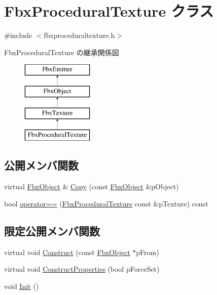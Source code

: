\hypertarget{class_fbx_procedural_texture}{}\section{Fbx\+Procedural\+Texture クラス}
\label{class_fbx_procedural_texture}


{\ttfamily \#include $<$fbxproceduraltexture.\+h$>$}

Fbx\+Procedural\+Texture の継承関係図\begin{figure}[H]
\begin{center}
\leavevmode
\includegraphics[height=4.000000cm]{class_fbx_procedural_texture}
\end{center}
\end{figure}
\subsection*{公開メンバ関数}
\begin{DoxyCompactItemize}
\item 
virtual \hyperlink{class_fbx_object}{Fbx\+Object} \& \hyperlink{class_fbx_procedural_texture_aab5e11d2e578c958cbe97f999379eeb4}{Copy} (const \hyperlink{class_fbx_object}{Fbx\+Object} \&p\+Object)
\item 
bool \hyperlink{class_fbx_procedural_texture_a0687270beaf7354bec0e230bd85a61b7}{operator==} (\hyperlink{class_fbx_procedural_texture}{Fbx\+Procedural\+Texture} const \&p\+Texture) const
\end{DoxyCompactItemize}
\subsection*{限定公開メンバ関数}
\begin{DoxyCompactItemize}
\item 
virtual void \hyperlink{class_fbx_procedural_texture_a2386483aef2766c16c911e6fd6539d32}{Construct} (const \hyperlink{class_fbx_object}{Fbx\+Object} $\ast$p\+From)
\item 
virtual void \hyperlink{class_fbx_procedural_texture_ae718dfc2092f735a1b6bcd724029a36c}{Construct\+Properties} (bool p\+Force\+Set)
\item 
void \hyperlink{class_fbx_procedural_texture_aea1c75e2dcb3caea85e9a231c9e94a75}{Init} ()
\end{DoxyCompactItemize}
